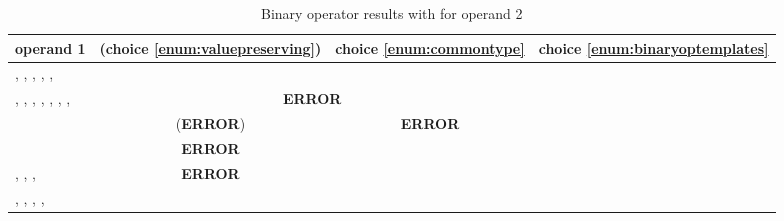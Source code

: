 \begingroup
  \def\err{\textbf{\color{constants}ERROR}}
  \def\schar{\code{\color{types}schar}}
  \def\uchar{\code{\color{types}uchar}}
  \def\sshort{\code{\color{types}short}}
  \def\ushort{\code{\color{types}ushort}}
  \def\sint{\code{\color{types}int}}
  \def\uint{\code{\color{types}uint}}
  \def\slong{\code{\color{types}long}}
  \def\ulong{\code{\color{types}ulong}}
  \def\sllong{\code{\color{types}llong}}
  \def\ullong{\code{\color{types}ullong}}
  \def\float{\code{\color{types}float}}
  \def\double{\code{\color{types}double}}
  \def\bool{\code{\color{types}bool}}
  \def\Vschar{\simd[<\schar>]}
  \def\Vuchar{\simd[<\uchar>]}
  \def\Vsshort{\simd[<\sshort>]}
  \def\Vushort{\simd[<\ushort>]}
  \def\Vsint{\simd[<\sint>]}
  \def\Vuint{\simd[<\uint>]}
  \def\Vslong{\simd[<\slong>]}
  \def\Vulong{\simd[<\ulong>]}
  \def\Vsllong{\simd[<\sllong>]}
  \def\Vullong{\simd[<\ullong>]}
  \def\Vfloat{\simd[<\float>]}
  \def\Vdouble{\simd[<\double>]}
  \def\mca#1{\multicolumn{2}{c|}{#1}}
  \def\mcb#1{\multicolumn{3}{c|}{#1}}
  \def\LHS{\simd[<operand1>]}
  \def\LHSa{\mca{\LHS}}
  \def\LHSb{\mcb{\LHS}}
  \def\RHSa{\mca{\RHS}}
  \def\RHSb{\mcb{\RHS}}
  \def\erra{\mca{\err}}
  \def\errb{\mcb{\err}}
  \def\Rrr{\RHS (\err)}
  \newenvironment{TypeTable}[2]{
    \begin{table}[htbp]
      \caption{Binary operator results with #1 for operand 2}
      \label{#2}
      \smaller
      \begin{tabular}{>{\raggedright}p{0.47\textwidth}|c|c|c|}
        operand 1
        & \wgDocumentNumber{} (choice \ref{enum:valuepreserving})
        & choice \ref{enum:commontype}
        & choice \ref{enum:binaryoptemplates} \\\hline
        \gdef\RHS{#1}
  }{
      \end{tabular}
    \end{table}
  }
  \begin{TypeTable}{\Vsshort}{tab:binopresults1}
    \schar, \uchar, \sshort, \Vschar, \Vuchar, \Vsshort
    & \RHSb \\\hline

    \ushort, \uint, \slong, \ulong, \sllong, \ullong, \float, \double
    & \erra & \LHS \\\hline

    \sint
    & \Rrr & \err & \LHS \\\hline

    \bool
    & \err & \RHSa \\\hline

    \simd[<\ushort>], \simd[<\uint>], \simd[<\ulong>], \simd[<\ullong>]
    & \err & \LHSa \\\hline

    \simd[<\sint>], \simd[<\slong>], \simd[<\sllong>], \simd[<\float>],
    \simd[<\double>]
    & \LHSb
  \end{TypeTable}

